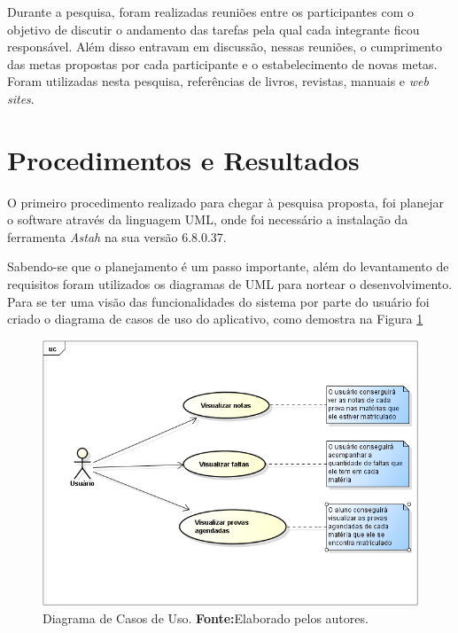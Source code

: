 	\par Durante a pesquisa, foram realizadas reuniões entre os participantes com
o objetivo de discutir o andamento das tarefas pela qual cada integrante ficou
responsável. Além disso entravam em discussão, nessas reuniões, o cumprimento
das metas propostas por cada participante e o estabelecimento de novas metas.
Foram utilizadas nesta pesquisa, referências de livros, revistas, manuais e
\textit{web sites}.


\section{Procedimentos e Resultados}
	
	\par O primeiro procedimento realizado para chegar à pesquisa proposta, foi
planejar o software através da linguagem UML, onde foi necessário a instalação
da ferramenta \textit{Astah} na sua versão 6.8.0.37.

	\par Sabendo-se que o planejamento é um passo importante, além do levantamento
de requisitos foram utilizados os diagramas de UML para nortear o
desenvolvimento. Para se ter uma visão das funcionalidades do sistema por parte
do usuário foi criado o diagrama de casos de uso do aplicativo, como demostra
na Figura \ref{fig:qm2}
		
		\begin{figure}[h!]
			\centerline{\includegraphics[scale=0.4]{./imagens/2_q_metodologico/qm2.png}}
			\caption[Diagrama de Casos de Uso]{Diagrama de Casos de Uso.
			 \textbf{Fonte:}Elaborado pelos autores.}
			\label{fig:qm2}
		\end{figure}
		
